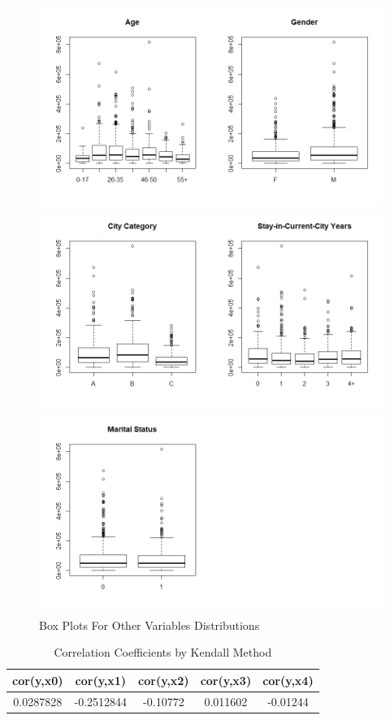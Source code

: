 \documentclass[12pt]{article}
\begin{document}
\begin{figure}[H]
	\centering
	\includegraphics[width=1\textwidth,height=.45\linewidth]{Rplot07.png}

	\centering
	\includegraphics[width=1\textwidth,height=.45\linewidth]{Rplot08.png}

	\centering
	\includegraphics[width=1\textwidth,height=.45\linewidth]{Rplot09.png}
	\caption{Box Plots For Other Variables Distributions}
\end{figure}

\begin{table}[htbp]
	\centering
	\caption{Correlation Coefficients by Kendall Method}
	\begin{tabular}{ccccc}
			\toprule[1.5pt]
		cor(y,x0) & cor(y,x1) & cor(y,x2) & cor(y,x3) & cor(y,x4) \\
		\toprule[1.5pt]
		0.0287828 & -0.2512844 & -0.10772 & 0.011602 & -0.01244 \\
		\toprule[1.5pt]
	\end{tabular}%
	\label{tab:addlabel}%
\end{table}%
\end{document}
